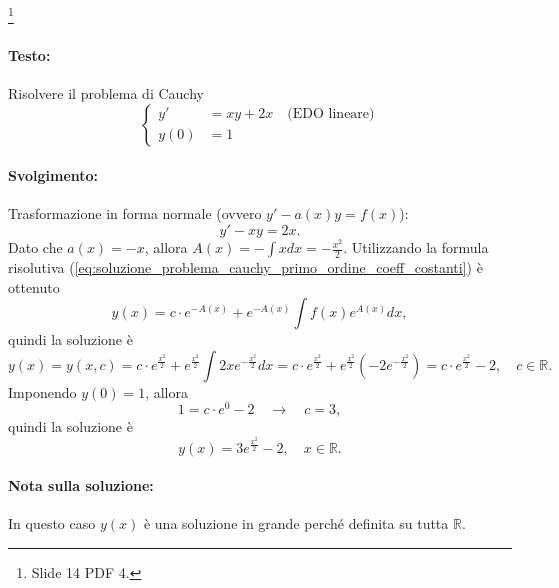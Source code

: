 \begin{example}\footnote{Slide 14 PDF 4.}
    \paragraph{Testo:} Risolvere il problema di Cauchy
    \begin{equation*}
        \begin{cases}
            y' &=xy+2x\quad\text{(EDO lineare)}\\
            y(0)& = 1
        \end{cases}
    \end{equation*}
    \paragraph{Svolgimento:} Trasformazione in forma normale (ovvero $y'-a(x)y=f(x)$):
    \begin{equation*}
        y'-xy = 2x.
    \end{equation*}
    Dato che $a(x)=-x$, allora $A(x)=-\int xdx=-\frac{x^2}{2}$. Utilizzando la formula risolutiva (\ref{eq:soluzione_problema_cauchy_primo_ordine_coeff_costanti}) è ottenuto
    \begin{equation*}
        y(x) = c\cdot e^{-A(x)} + e^{-A(x)}\int f(x) e^{A(x)} dx,
    \end{equation*}
    quindi la soluzione è
    \begin{equation*}
        y(x)=y(x,c)= c\cdot e^{\frac{x^2}{2}}+ e^{\frac{x^2}{2}}\int 2xe^{-\frac{x^2}{2}}dx = c\cdot e^{\frac{x^2}{2}}+ e^{\frac{x^2}{2}}\left(-2 e^{-\frac{x^2}{2}}\right)=c\cdot e^{\frac{x^2}{2}}-2,\quad c\in\mathbb R.
    \end{equation*}
    Imponendo $y(0)=1$, allora
    \begin{equation*}
        1=c\cdot e^{0} -2\quad \rightarrow\quad c = 3,
    \end{equation*}
    quindi la soluzione è
    \begin{equation*}
        y(x) = 3e^{\frac{x^2}{2}}-2,\quad x\in\mathbb R.
    \end{equation*}
    \paragraph{Nota sulla soluzione:} In questo caso $y(x)$ è una soluzione in grande perché definita su tutta $\mathbb R$.
\end{example}

